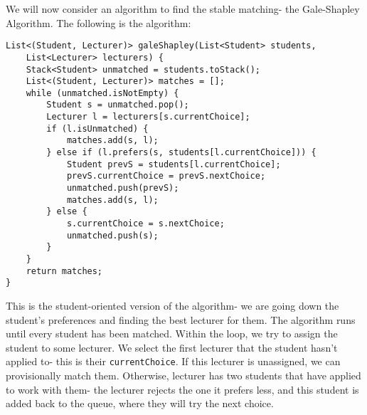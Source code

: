 \documentclass[a4paper, openany]{memoir}
\begin{document}
    We will now consider an algorithm to find the stable matching- the Gale-Shapley Algorithm. The following is the algorithm:
\begin{lstlisting}[language=pseudocode]
List<(Student, Lecturer)> galeShapley(List<Student> students, 
    List<Lecturer> lecturers) {
    Stack<Student> unmatched = students.toStack();
    List<(Student, Lecturer)> matches = [];
    while (unmatched.isNotEmpty) {
        Student s = unmatched.pop();
        Lecturer l = lecturers[s.currentChoice];
        if (l.isUnmatched) {
            matches.add(s, l);
        } else if (l.prefers(s, students[l.currentChoice])) {
            Student prevS = students[l.currentChoice];
            prevS.currentChoice = prevS.nextChoice;
            unmatched.push(prevS);
            matches.add(s, l);
        } else {
            s.currentChoice = s.nextChoice;
            unmatched.push(s);
        }
    }
    return matches;
}
\end{lstlisting}
    \noindent This is the student-oriented version of the algorithm- we are going down the student's preferences and finding the best lecturer for them. The algorithm runs until every student has been matched. Within the loop, we try to assign the student to some lecturer. We select the first lecturer that the student hasn't applied to- this is their \texttt{currentChoice}. If this lecturer is unassigned, we can provisionally match them. Otherwise, lecturer has two students that have applied to work with them- the lecturer rejects the one it prefers less, and this student is added back to the queue, where they will try the next choice. 
    
\end{document}
